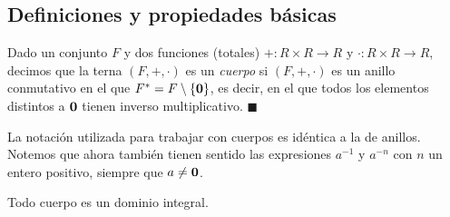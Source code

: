 \subsection{Definiciones y propiedades básicas}
\begin{definition}[Cuerpo]
Dado un conjunto $F$ y dos funciones (totales) $+ \colon R \times R \to R$ y $\cdot \colon R \times R \to R$, decimos que la terna $(F, +, \cdot)$ es un \emph{cuerpo} si $(F, +, \cdot)$ es un anillo conmutativo en el que $F^\ast = F \setminus \{\mathbf{0}\}$, es decir, en el que todos los elementos distintos a $\mathbf{0}$ tienen inverso multiplicativo. 
\hfill$\blacksquare$
\end{definition}

La notación utilizada para trabajar con cuerpos es idéntica a la de anillos. Notemos que ahora también tienen sentido las expresiones $a^{-1}$ y $a^{-n}$ con $n$ un entero positivo, siempre que $a \neq \mathbf{0}$.


\begin{proposition} \label{cuerpos_son_dominios_integrales}
Todo cuerpo es un dominio integral.
\end{proposition}

